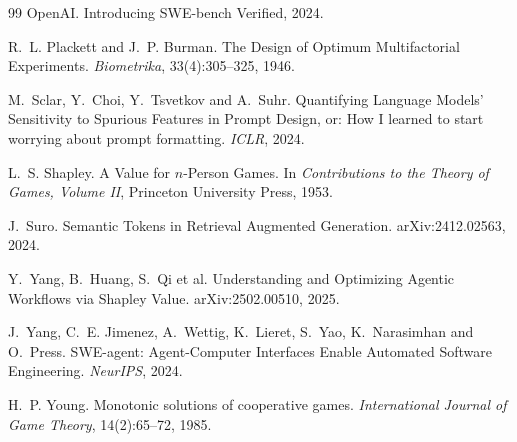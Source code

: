 \documentclass[11pt]{article}
\theoremstyle{plain}
\theoremstyle{definition}
\theoremstyle{remark}
\begin{document}
\begin{thebibliography}{99}
 OpenAI. Introducing SWE-bench Verified, 2024.

 R.~L. Plackett and J.~P. Burman. The Design of Optimum Multifactorial Experiments. \emph{Biometrika}, 33(4):305--325, 1946.

 M.~Sclar, Y.~Choi, Y.~Tsvetkov and A.~Suhr. Quantifying Language Models' Sensitivity to Spurious Features in Prompt Design, or: How I learned to start worrying about prompt formatting. \emph{ICLR}, 2024.

 L.~S. Shapley. A Value for $n$-Person Games. In \emph{Contributions to the Theory of Games, Volume II}, Princeton University Press, 1953.

 J.~Suro. Semantic Tokens in Retrieval Augmented Generation. arXiv:2412.02563, 2024.

 Y.~Yang, B.~Huang, S.~Qi et al. Understanding and Optimizing Agentic Workflows via Shapley Value. arXiv:2502.00510, 2025.

 J.~Yang, C.~E. Jimenez, A.~Wettig, K.~Lieret, S.~Yao, K.~Narasimhan and O.~Press. SWE-agent: Agent-Computer Interfaces Enable Automated Software Engineering. \emph{NeurIPS}, 2024.

 H.~P. Young. Monotonic solutions of cooperative games. \emph{International Journal of Game Theory}, 14(2):65--72, 1985.

\end{thebibliography}
\end{document}
